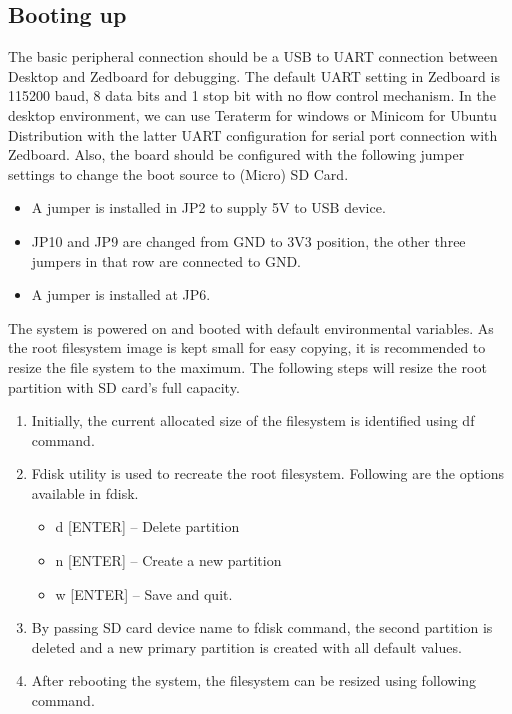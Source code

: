 \subsection{Booting up}
The basic peripheral connection should be a USB to UART connection between Desktop and Zedboard for debugging. The default UART setting in Zedboard is 115200 baud, 8 data bits and 1 stop bit with no flow control mechanism.  In the desktop environment, we can use Teraterm for windows or Minicom for Ubuntu Distribution with the latter UART configuration for serial port connection with Zedboard. Also, the board should be configured with the following jumper settings to change the boot source to (Micro) SD Card.
\begin{itemize}\itemsep0em 
	\item A jumper is installed in JP2 to supply 5V to USB device.
	\item JP10 and JP9 are changed from GND to 3V3 position, the other three jumpers in that row are connected to GND.
	\item A jumper is installed at JP6.
\end{itemize}

The system is powered on and booted with default environmental variables. As the root filesystem image is kept small for easy copying, it is recommended to resize the file system to the maximum. The following steps will resize the root partition with SD card’s full capacity.
\begin{enumerate}\itemsep0em 
	\item Initially, the current allocated size of the filesystem is identified using df command.
	
	\item Fdisk utility is used to recreate the root filesystem. Following are the options available in fdisk.
	\begin{itemize}\itemsep0em 
	\item d [ENTER] -- Delete partition
	\item n [ENTER] -- Create a new partition
	\item w [ENTER] -- Save and quit.
	\end{itemize}
	\item By passing SD card device name to fdisk command, the second partition is deleted and a new primary partition is created with all default values. 
	
	\item After rebooting the system, the filesystem can be resized using following command.
	
\end{enumerate}